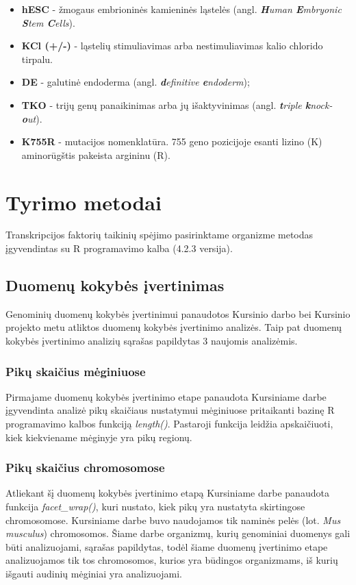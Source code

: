 \documentclass[12pt]{article}
\begin{document}
\begin{itemize}
    \item \textbf{hESC} - žmogaus embrioninės kamieninės ląstelės
          (angl. \emph{\textbf{H}uman \textbf{E}mbryonic \textbf{S}tem
          \textbf{C}ells}).
    \item \textbf{KCl (+/-)} - ląstelių stimuliavimas arba nestimuliavimas kalio
          chlorido tirpalu.
    \item \textbf{DE} - galutinė endoderma (angl. \emph{\textbf{d}efinitive
          \textbf{e}ndoderm});
    \item \textbf{TKO} - trijų genų panaikinimas arba jų išaktyvinimas
          (angl. \emph{\textbf{t}riple \textbf{k}nock-\textbf{o}ut}).
    \item \textbf{K755R} - mutacijos nomenklatūra. 755 geno pozicijoje esanti
          lizino (K) aminorūgštis pakeista argininu (R).
\end{itemize}

\newpage


\section{Tyrimo metodai}
Transkripcijos faktorių taikinių spėjimo pasirinktame organizme metodas
įgyvendintas su R programavimo kalba\cite{R} (4.2.3 versija).

\subsection{Duomenų kokybės įvertinimas}
Genominių duomenų kokybės įvertinimui panaudotos Kursinio darbo bei Kursinio
projekto metu atliktos duomenų kokybės įvertinimo analizės. Taip pat
duomenų kokybės įvertinimo analizių sąrašas papildytas 3 naujomis analizėmis.

\subsubsection*{Pikų skaičius mėginiuose}
Pirmajame duomenų kokybės įvertinimo etape panaudota Kursiniame darbe
įgyvendinta analizė pikų skaičiaus nustatymui mėginiuose pritaikanti bazinę R
programavimo kalbos funkciją \emph{length()}. Pastaroji funkcija leidžia
apskaičiuoti, kiek kiekviename mėginyje yra pikų regionų.

\subsubsection*{Pikų skaičius chromosomose}
Atliekant šį duomenų kokybės įvertinimo etapą Kursiniame darbe panaudota
funkcija \emph{facet\_wrap()}, kuri nustato, kiek pikų yra nustatyta skirtingose
chromosomose. Kursiniame darbe buvo naudojamos tik naminės pelės
(lot. \emph{Mus musculus}) chromosomos. Šiame darbe organizmų, kurių genominiai
duomenys gali būti analizuojami, sąrašas papildytas, todėl šiame duomenų
įvertinimo etape analizuojamos tik tos chromosomos, kurios yra būdingos
organizmams, iš kurių išgauti audinių mėginiai yra analizuojami.
\end{document}
